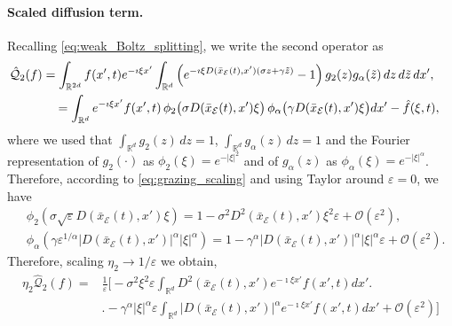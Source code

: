 \documentclass[11pt,handout]{article}%
\numberwithin{equation}{section}
\theoremstyle{definition}
\def\RR{\mathbb R}
\begin{document}
\paragraph{Scaled diffusion term.}
Recalling \eqref{eq:weak_Boltz_splitting}, we write the second operator as
\begin{align}\label{eq:operator_Q2}
	\hat{\mathcal{Q}}_2(f)
	&= \int_{\mathbb{R}^{2d}} f(x',t) e^{-\imath \xi x'} 
	\int_{\mathbb{R}^d} \left(e^{-\imath \xi D(\bar{x}_\mathcal{E}(t),x') ( \sigma z + \gamma \tilde z)} - 1
	\right)g_2(z)g_\alpha(\tilde z) \,dz\,d \tilde z \, dx',\cr
	&\quad= \int_{\mathbb{R}^d} e^{-\imath \xi x'} f(x',t)\, 
	\phi_2\big(\sigma D(\bar{x}_\mathcal{E}(t),x')\xi\big)\, \phi_\alpha\big(\gamma D(\bar{x}_\mathcal{E}(t),x')\xi\big)dx'
	- \hat{f}(\xi,t),
\end{align}
where we used that $\int_{\mathbb{R}^d} g_2(z)\,dz = 1$, $\int_{\mathbb{R}^d} g_\alpha(z)\,dz = 1$ and the Fourier representation of $g_2(\cdot)$ as
$\phi_2(\xi)=e^{-|\xi|^2}$ and of $g_\alpha(z)$ as $\phi_\alpha(\xi) = e^{-|\xi|^\alpha}$. Therefore, according to \eqref{eq:grazing_scaling} and using Taylor around $\varepsilon=0$, we have
\begin{equation}
	\begin{split}
		&\phi_2(\sigma \sqrt{\varepsilon} D(\bar{x}_\mathcal{E}(t),x') \xi)
		=1 -\sigma^2 D^2(\bar{x}_\mathcal{E}(t),x') \xi^2 \varepsilon + \mathcal{O}(\varepsilon^2),\\%
		&\phi_\alpha(\gamma \varepsilon^{1/\alpha} \vert D(\bar{x}_\mathcal{E}(t),x')\vert^\alpha \vert \xi\vert^\alpha) 
		= 1 -\gamma^\alpha \vert D (\bar{x}_\mathcal{E}(t),x') \vert^\alpha \vert \xi\vert^\alpha \varepsilon + \mathcal{O}(\varepsilon^2).
	\end{split}
\end{equation}
Therefore, scaling $\eta_2\rightarrow 1/\varepsilon$ we obtain,
\begin{align}
	\eta_2 \hat{\mathcal{Q}}_2(f) = &\frac{1}{\varepsilon} \Big[-\sigma^2 \xi^2 \varepsilon \int_{\RR^d} D^2(\bar{x}_\mathcal{E}(t),x') e^{-\imath \xi x'} f(x',t) dx'  \Big. \\
	& \Big. - \gamma^\alpha \vert \xi\vert^\alpha \varepsilon \int_{\RR^d} \vert D(\bar{x}_\mathcal{E}(t),x')\vert^\alpha e^{-\imath \xi x'} f(x',t) dx' + \mathcal{O}(\varepsilon^2) \Big]%
\end{align}
\end{document}
